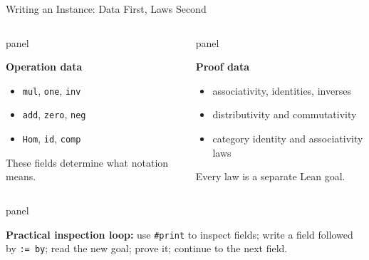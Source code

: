 \documentclass[aspectratio=169,10pt]{beamer}
\newcommand{\term}[1]{\textcolor{DOneBlue}{\textbf{#1}}}
\newenvironment{dpanel}{%
  \begin{beamercolorbox}[wd=\dimexpr\linewidth-9pt\relax,leftskip=0.15cm,rightskip=0.15cm plus1fil,rounded=true]{panel}%
  \setlength{\linewidth}{\hsize}%
  \vspace{0.10cm}%
}{\vspace{0.10cm}\end{beamercolorbox}}
\begin{document}
\begin{frame}{Writing an Instance: Data First, Laws Second}
\begin{columns}[T,onlytextwidth]
  \begin{dpanel}
  \term{Operation data}
  \begin{itemize}
    \item \texttt{mul}, \texttt{one}, \texttt{inv}
    \item \texttt{add}, \texttt{zero}, \texttt{neg}
    \item \texttt{Hom}, \texttt{id}, \texttt{comp}
  \end{itemize}
  These fields determine what notation means.
  \end{dpanel}
  \begin{dpanel}
  \term{Proof data}
  \begin{itemize}
    \item associativity, identities, inverses
    \item distributivity and commutativity
    \item category identity and associativity laws
  \end{itemize}
  Every law is a separate Lean goal.
  \end{dpanel}
\end{columns}
\vspace{0.35cm}
\begin{dpanel}
\term{Practical inspection loop:} use \texttt{\#print} to inspect fields; write a field followed by \texttt{:= by}; read the new goal; prove it; continue to the next field.
\end{dpanel}
\end{frame}
\end{document}
